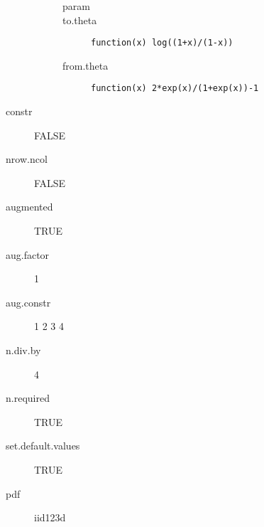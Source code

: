 \begin{description}
\begin{description}
\begin{description}
	 	 	 \item[ param ]  
	 	 	 \item[ to.theta ] \verb|function(x) log((1+x)/(1-x))| 
	 	 	 \item[ from.theta ] \verb|function(x) 2*exp(x)/(1+exp(x))-1| 
	 	 \end{description}
	 \end{description}
	 \item[ constr ] FALSE 
	 \item[ nrow.ncol ] FALSE 
	 \item[ augmented ] TRUE 
	 \item[ aug.factor ] 1 
	 \item[ aug.constr ] 1 2 3 4 
	 \item[ n.div.by ] 4 
	 \item[ n.required ] TRUE 
	 \item[ set.default.values ] TRUE 
	 \item[ pdf ] iid123d 
\end{description}
